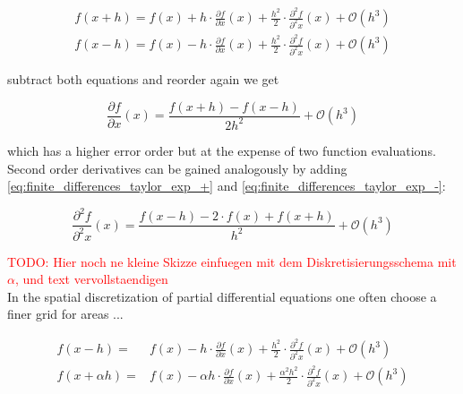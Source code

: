\documentclass{scrartcl}[12pt, halfparskip]
\newcommand{\todo}[1]{\textcolor{red}{TODO: #1}}
\begin{document}
\begin{subequations}
\label{eq:finite_differences_taylor_exp}
\begin{align}
	f(x+h) = f(x) + h \cdot \frac{\partial f}{\partial x}(x) + \frac{h^2}{2} \cdot \frac{\partial^2 f}{\partial^2 x}(x) + \mathcal{O}(h^3) \label{eq:finite_differences_taylor_exp_+} \\
	f(x-h) = f(x) - h \cdot \frac{\partial f}{\partial x}(x) + \frac{h^2}{2} \cdot \frac{\partial^2 f}{\partial^2 x}(x) + \mathcal{O}(h^3)  \label{eq:finite_differences_taylor_exp_-}	
\end{align}
\end{subequations}


subtract both equations and reorder again we get

\begin{equation}
	\frac{\partial f}{\partial x}(x) = \frac{f(x+h) - f(x-h)}{2 h^2} + \mathcal{O}(h^3)
\end{equation}

which has a higher error order but at the expense of two function evaluations. \\

Second order derivatives can be gained analogously by adding \eqref{eq:finite_differences_taylor_exp_+} and \eqref{eq:finite_differences_taylor_exp_-}:

\begin{equation}
	\frac{\partial^2 f}{\partial^2 x}(x) = \frac{f(x-h) - 2 \cdot f(x) + f(x+h)}{h^2} + \mathcal{O}(h^3)
	\label{eq:finite_difference_2nd_der}
\end{equation}


\todo{Hier noch ne kleine Skizze einfuegen mit dem Diskretisierungsschema mit $\alpha$, und text vervollstaendigen} \\
In the spatial discretization of partial differential equations one often choose a finer grid for areas ...

\begin{subequations}
	\label{eq:finite_differences_taylor_exp_non-homogenous}
	\begin{align}
	f(x-h) = & f(x) - h \cdot \frac{\partial f}{\partial x}(x) + \frac{h^2}{2} \cdot \frac{\partial^2 f}{\partial^2 x}(x) + \mathcal{O}(h^3) \label{eq:finite_differences_taylor_exp_non-homogenous_1} \\
	f(x+\alpha h) = & f(x) - \alpha h \cdot \frac{\partial f}{\partial x}(x) + \frac{\alpha^2 h^2}{2} \cdot \frac{\partial^2 f}{\partial^2 x}(x) + \mathcal{O}(h^3)  \label{eq:finite_differences_taylor_exp_non-homogenous_2}
	\end{align}
\end{subequations}
\end{document}
